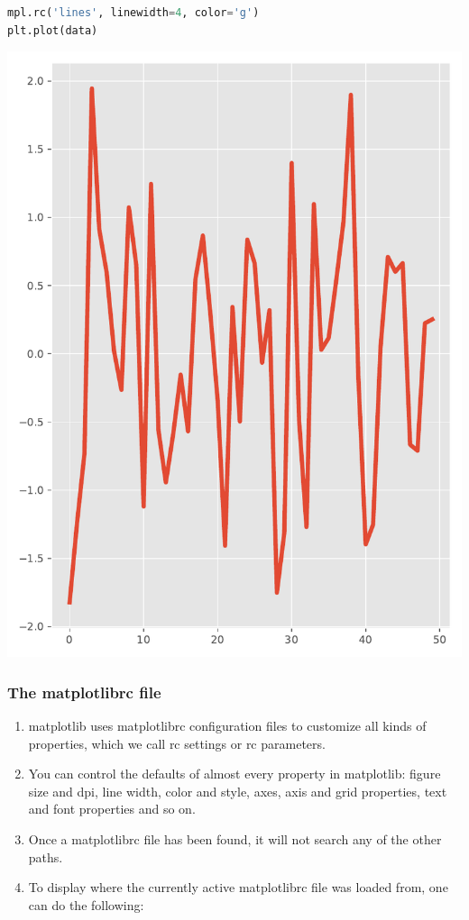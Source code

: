\documentclass[UTF8,a4paper,12pt]{ctexart}  %
\providecommand{\tightlist}{\setlength{\itemsep}{0pt}\setlength{\parskip}{0pt}}
\begin{document}
\begin{lstlisting}[language=Python]
mpl.rc('lines', linewidth=4, color='g')
plt.plot(data)
\end{lstlisting}

\begin{center}\includegraphics[width=0.9\linewidth]{python-visualization_files/figure-latex/unnamed-chunk-36-1} \end{center}

\hypertarget{the-matplotlibrc-file}{%
\subsubsection{The matplotlibrc file}\label{the-matplotlibrc-file}}

\begin{enumerate}
\def\labelenumi{\arabic{enumi}.}
\tightlist
\item
  matplotlib uses matplotlibrc configuration files to customize all
  kinds of properties, which we call rc settings or rc parameters.
\item
  You can control the defaults of almost every property in matplotlib:
  figure size and dpi, line width, color and style, axes, axis and
  grid properties, text and font properties and so on.
\item
  Once a matplotlibrc file has been found, it will not search any of
  the other paths.
\item
  To display where the currently active matplotlibrc file was loaded
  from, one can do the following:
\end{enumerate}
\end{document}
